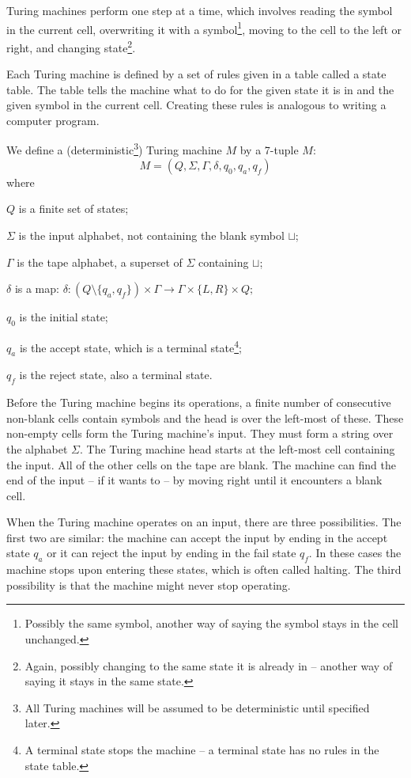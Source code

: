 \documentclass{iansnotes}
\begin{document}
  Turing machines perform one step at a time, which involves reading the symbol in the current cell, overwriting it with a symbol\footnote{Possibly the same symbol, another way of saying the symbol stays in the cell unchanged.}, moving to the cell to the left or right, and changing state\footnote{Again, possibly changing to the same state it is already in -- another way of saying it stays in the same state.}.
  
  Each Turing machine is defined by a set of rules given in a table called a state table.
  The table tells the machine what to do for the given state it is in and the given symbol in the current cell.
  Creating these rules is analogous to writing a computer program.

  We define a (deterministic\footnote{All Turing machines will be assumed to be deterministic until specified later.}) Turing machine $M$ by a 7-tuple $M$:
  \[ M = ( Q, \Sigma, \Gamma, \delta, q_0, q_a, q_f ) \]
  where
\begin{description}
  \item $Q$ is a finite set of states;
  \item $\Sigma$ is the input alphabet, not containing the blank symbol $\sqcup$;
  \item $\Gamma$ is the tape alphabet, a superset of $\Sigma$ containing $\sqcup$;
  \item $\delta$ is a map: $\delta: (Q \setminus \{ q_a, q_f \}) \times \Gamma \rightarrow \Gamma \times \{ L, R \} \times Q;$
  \item $q_0$ is the initial state;
  \item $q_a$ is the accept state, which is a terminal state\footnote{A terminal state stops the machine -- a terminal state has no rules in the state table.};
  \item $q_f$ is the reject state, also a terminal state.  
\end{description}

  Before the Turing machine begins its operations, a finite number of consecutive non-blank cells contain symbols and the head is over the left-most of these.
  These non-empty cells form the Turing machine's input.
  They must form a string over the alphabet $\Sigma$.
  The Turing machine head starts at the left-most cell containing the input.
  All of the other cells on the tape are blank.
  The machine can find the end of the input -- if it wants to -- by moving right until it encounters a blank cell.

  When the Turing machine operates on an input, there are three possibilities.
  The first two are similar: the machine can accept the input by ending in the accept state $q_a$ or it can reject the input by ending in the fail state $q_f$.
  In these cases the machine stops upon entering these states, which is often called halting.
  The third possibility is that the machine might never stop operating.
\end{document}
